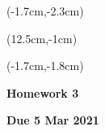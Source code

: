 \documentclass[12pt, oneside]{article}
\begin{document}
\begin{textblock*}{4cm}(-1.7cm,-2.3cm)
\end{textblock*}

\begin{textblock*}{8cm}(12.5cm,-1cm)
\end{textblock*}
\begin{textblock*}{13.5cm}(-1.7cm,-1.8cm)
\end{textblock*}

\vspace{1cm}

\begin{center}
\textbf{\Large Homework 3}

\textbf{Due 5 Mar 2021}
\end{center}
\end{document}

